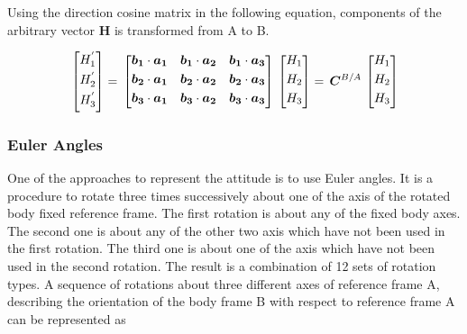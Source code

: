 Using the direction cosine matrix in the following equation, components of the arbitrary vector $\bm{H}$ is transformed from A to B.

\begin{equation}{\label{transformVectorH}}
\begin{bmatrix}
H_1^{'}\\[0.3em]
H_2^{'}\\[0.3em]
H_3^{'}\\[0.3em]
\end{bmatrix}
=\,
\begin{bmatrix}
 \bm{b_1} \cdot \bm{a_1}  &  \bm{b_1} \cdot \bm{a_2}  &  \bm{b_1} \cdot \bm{a_3} \\[0.3em]
 \bm{b_2} \cdot \bm{a_1}  & \bm{b_2} \cdot \bm{a_2}  & \bm{b_2} \cdot \bm{a_3} \\[0.3em]
 \bm{b_3} \cdot \bm{a_1}  & \bm{b_3} \cdot \bm{a_2}  &  \bm{b_3} \cdot \bm{a_3} \\[0.3em]
\end{bmatrix}
\,
\begin{bmatrix}
 H_1\\[0.3em]
 H_2\\[0.3em]
 H_3\\[0.3em]
\end{bmatrix}
=\,
\bm{C}^{B/A}
\,
\begin{bmatrix}
H_1\\[0.3em]
H_2\\[0.3em]
H_3\\[0.3em]
\end{bmatrix}
\end{equation} 

\subsubsection{Euler Angles}

One of the approaches to represent the attitude is to use Euler angles. 
It is a procedure to rotate three times successively about one of the axis of the rotated body fixed reference frame. 
The first rotation is about any of the fixed body axes. 
The second one is about any of the other two axis which have not been used in the first rotation. 
The third one is about one of the axis which have not been used in the second rotation. 
The result is a combination of 12 sets of rotation types. 
A sequence of rotations about three different axes of reference frame A, describing the orientation of the body frame B with respect to reference frame A can be represented as

